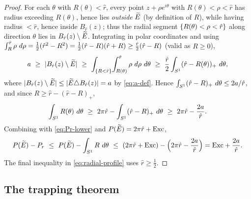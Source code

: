 \begin{proof}
For each $\theta$ with $R(\theta)<\hat r$, every point $z+\rho e^{i\theta}$
with $R(\theta)<\rho<\hat r$ has radius exceeding $R(\theta)$, hence lies
\emph{outside} $\widetilde{E}$ (by definition of $R$), while having radius $<\hat r$,
hence inside $B_{\hat r}(z)$; thus the radial segment $\left\{R(\theta)<\rho
<\hat r\right\}$ along direction $\theta$ lies in $B_{\hat r}(z)\setminus\widetilde{E}$.
Integrating in polar coordinates and using
$\int_{R}^{\hat r}\rho\,\,d\rho=\tfrac12(\hat r^2-R^2)
=\tfrac12(\hat r-R)(\hat r+R)\ge\tfrac{\hat r}{2}(\hat r-R)$ (valid as
$R\ge0$),
\[
   a\ \ge\ |B_{\hat r}(z)\setminus\widetilde{E}|
   \ \ge\ \int_{\left\{R<\hat r\right\}}\!\int_{R(\theta)}^{\hat r}\rho\,\,d\rho\,\,d\theta
   \ \ge\ \frac{\hat r}{2}\int_{S^1}(\hat r-R(\theta))_+\,\,d\theta,
\]
where $|B_{\hat r}(z)\setminus\widetilde{E}|\le|\widetilde{E}\triangle B_{\hat r}(z)|=a$ by
\eqref{eq:a-def}. Hence $\int_{S^1}(\hat r-R)_+\,\,d\theta\le 2a/\hat r$, and
since $R\ge\hat r-(\hat r-R)_+$,
\[
   \int_{S^1}R(\theta)\,\d\theta\ \ge\ 2\pi\hat r-\int_{S^1}(\hat r-R)_+\,\d\theta
   \ \ge\ 2\pi\hat r-\frac{2a}{\hat r}.
\]
Combining with \eqref{eq:Pr-lower} and $P(\widetilde{E})=2\pi\hat r+\mathrm{Exc}$,
\[
   P(\widetilde{E})-P_r\ \le\ P(\widetilde{E})-\int_{S^1}R\,\,d\theta
   \ \le\ (2\pi\hat r+\mathrm{Exc})-\Bigl(2\pi\hat r-\frac{2a}{\hat r}\Bigr)
   =\mathrm{Exc}+\frac{2a}{\hat r}.
\]
The final inequality in \eqref{eq:radial-profile} uses $\hat r\ge\tfrac12$.
\end{proof}

\subsection{The trapping theorem}

